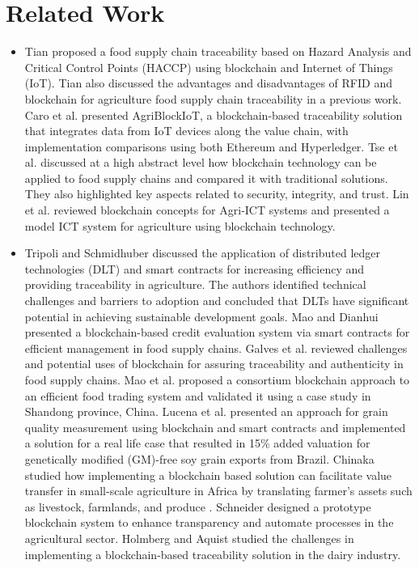 \section{Related Work}
\begin{itemize}
    \item Tian proposed a food supply chain traceability \cite{bib1} 
    based on Hazard Analysis and Critical Control Points 
    (HACCP) using blockchain and Internet of Things (IoT). 
    Tian also discussed the advantages and disadvantages of 
    RFID and blockchain for agriculture food supply chain 
    traceability in a previous work. Caro et al. presented 
    AgriBlockIoT, a blockchain-based traceability solution 
    that integrates data from IoT devices along the value 
    chain, with implementation comparisons using both 
    Ethereum and Hyperledger. Tse et al. discussed at a high 
    abstract level how blockchain technology can be applied 
    to food supply chains and compared it with traditional 
    solutions. They also highlighted key aspects related to 
    security, integrity, and trust. Lin et al. reviewed 
    blockchain concepts for Agri-ICT systems and presented 
    a model ICT system for agriculture using blockchain 
    technology.
    
    \item Tripoli and Schmidhuber discussed the application of 
    distributed ledger technologies (DLT) and smart 
    contracts for increasing efficiency and providing 
    traceability in agriculture. The authors identified 
    technical challenges and barriers to adoption and 
    concluded that DLTs have significant potential in 
    achieving sustainable development goals. Mao and 
    Dianhui presented a blockchain-based credit evaluation 
    system via smart contracts for efficient management in 
    food supply chains. Galves et al. reviewed challenges and 
    potential uses of blockchain for assuring traceability and 
    authenticity in food supply chains. Mao et al. proposed a 
    consortium blockchain approach to an efficient food 
    trading system and validated it using a case study in 
    Shandong province, China. Lucena et al. presented an 
    approach for grain quality measurement using blockchain 
    and smart contracts and implemented a solution for a real life case that resulted in 15\% added valuation for 
    genetically modified (GM)-free soy grain exports from 
    Brazil. Chinaka studied how implementing a blockchain based solution can facilitate value transfer in small-scale 
    agriculture in Africa by translating farmer's assets such as 
    livestock, farmlands, and produce . Schneider designed a 
    prototype blockchain system to enhance transparency and 
    automate processes in the agricultural sector. Holmberg 
    and Aquist studied the challenges in implementing a 
    blockchain-based traceability solution in the dairy 
    industry.
    

\end{itemize}
